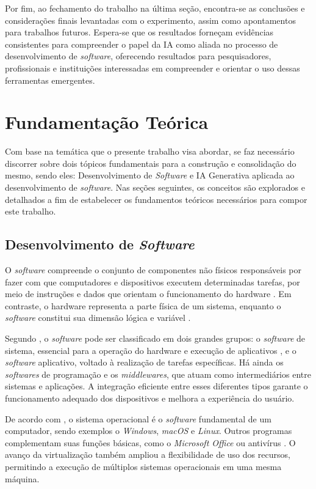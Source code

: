 \documentclass[english,brazilian]{UNISINOSartigo} %
\begin{document}
Por fim, ao fechamento do trabalho na última seção, encontra-se as conclusões e considerações finais levantadas com o experimento, assim como apontamentos para trabalhos futuros. Espera-se que os resultados forneçam evidências consistentes para compreender o papel da IA como aliada no processo de desenvolvimento de \textit{software}, oferecendo resultados para pesquisadores, profissionais e instituições interessadas em compreender e orientar o uso dessas ferramentas emergentes.

\section{Fundamentação Teórica}

Com base na temática que o presente trabalho visa abordar, se faz necessário discorrer sobre dois tópicos fundamentais para a construção e consolidação do mesmo, sendo eles: Desenvolvimento de \textit{Software} e IA Generativa aplicada ao desenvolvimento de \textit{software}. Nas seções seguintes, os conceitos são explorados e detalhados a fim de estabelecer os fundamentos teóricos necessários para compor este trabalho.

\subsection{Desenvolvimento de \textit{Software}}

O \textit{software} compreende o conjunto de componentes não físicos responsáveis por fazer com que computadores e dispositivos executem determinadas tarefas, por meio de instruções e dados que orientam o funcionamento do hardware \cite{coutinho2021}. Em contraste, o hardware representa a parte física de um sistema, enquanto o \textit{software} constitui sua dimensão lógica e variável \cite{sakurai2018}.

Segundo , o \textit{software} pode ser classificado em dois grandes grupos: o \textit{software} de sistema, essencial para a operação do hardware e execução de aplicativos \cite{schwab2019}, e o \textit{software} aplicativo, voltado à realização de tarefas específicas. Há ainda os \textit{softwares} de programação e os \textit{middlewares}, que atuam como intermediários entre sistemas e aplicações. A integração eficiente entre esses diferentes tipos garante o funcionamento adequado dos dispositivos e melhora a experiência do usuário.

De acordo com , o sistema operacional é o \textit{software} fundamental de um computador, sendo exemplos o \textit{Windows}, \textit{macOS} e \textit{Linux}. Outros programas complementam suas funções básicas, como o \textit{Microsoft Office} ou antivírus \cite{neto2019}. O avanço da virtualização também ampliou a flexibilidade de uso dos recursos, permitindo a execução de múltiplos sistemas operacionais em uma mesma máquina.
\end{document}
